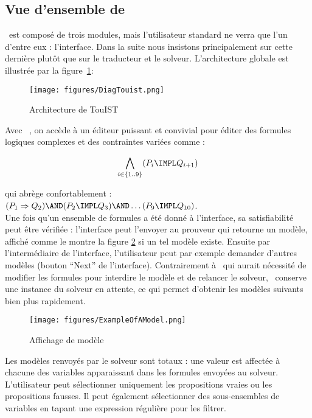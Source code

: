 \subsection{Vue d'ensemble de \touist}\label{sec:sat_interface}


\touist\ est composé de trois modules, mais l'utilisateur standard ne verra que l'un d'entre eux : l'interface. Dans la suite nous insistons principalement sur cette dernière plut\^ot que sur le traducteur et le solveur. L'architecture globale est illustr\'{e}e par la figure~\ref{fig:architectureTouisT}: 

\begin{figure}[htbp]
\centering
\texttt{[image: figures/DiagTouist.png]}
  \caption{Architecture de TouIST}
  \label{fig:architectureTouisT}
\end{figure}

Avec \touist\ , on accède à un éditeur puissant et convivial pour éditer des formules logiques complexes et des contraintes variées comme :

$$\bigwedge_{i \in \{1..9\}} (P_i \IMPL Q_{i+1})$$

qui abrège confortablement :\\ 

$(P_1 \Rightarrow Q_2) \AND (P_2 \IMPL Q_3) \AND \ldots (P_9\IMPL Q_{10})$. 
\\

Une fois qu'un ensemble de formules a été donné à l'interface, sa satisfiabilité peut \^etre vérifiée : l'interface peut l'envoyer au prouveur qui retourne un modèle, affich\'{e} comme le montre la figure \ref{fig:ExampleOfAModel} si un tel mod\`{e}le existe. Ensuite par l'intermédiaire de l'interface, l'utilisateur peut par exemple demander d'autres modèles (bouton ``Next'' de l'interface). Contrairement à \satoulouse\ qui aurait nécessité de modifier les formules pour interdire le modèle et de relancer le solveur, \touist\ conserve une instance du solveur en attente, ce qui permet d'obtenir les modèles suivants bien plus rapidement.

\begin{figure}[htbp]
\centering
\texttt{[image: figures/ExampleOfAModel.png]}
  \caption{Affichage de mod\`{e}le}
  \label{fig:ExampleOfAModel}
\end{figure}

Les mod\`{e}les renvoy\'{e}s par le solveur sont totaux : une valeur est affect\'{e}e \`{a} chacune des variables apparaissant dans les formules envoy\'{e}es au solveur. L'utilisateur peut s\'{e}lectionner uniquement les propositions vraies ou les propositions fausses. Il peut \'{e}galement s\'{e}lectionner des sous-ensembles de variables en tapant une expression r\'{e}guli\`{e}re pour les filtrer.
